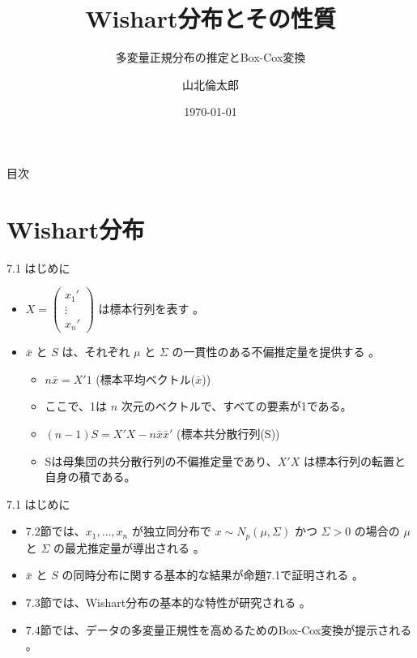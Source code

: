 \documentclass[aspectratio=169]{beamer}
\begin{document}
\begin{CJK}{UTF8}{min}

\title{Wishart分布とその性質}
\subtitle{多変量正規分布の推定とBox-Cox変換}
\author{山北倫太郎}
\date{\today}

\begin{frame}
\titlepage
\end{frame}

\begin{frame}{目次}
\tableofcontents
\end{frame}

\section{Wishart分布}

\begin{frame}{7.1 はじめに}
\begin{itemize}
    \item $X=\begin{pmatrix}x_1' \\ \vdots \\ x_n'\end{pmatrix}$ は標本行列を表す 。
    \item $\bar{x}$ と $S$ は、それぞれ $\mu$ と $\Sigma$ の一貫性のある不偏推定量を提供する 。
    \begin{itemize}
        \item $n\bar{x}=X'1$ (標本平均ベクトル($\bar{x}$))
        \item ここで、1は $n$ 次元のベクトルで、すべての要素が1である。\\
        \item $(n-1)S=X'X-n\bar{x}\bar{x}'$ (標本共分散行列(S))
        \item Sは母集団の共分散行列の不偏推定量であり、$X'X$ は標本行列の転置と自身の積である。
    \end{itemize}

\end{itemize}
\end{frame}
\begin{frame}{7.1 はじめに}
\begin{itemize}
    \item 7.2節では、$x_1, \dots, x_n$ が独立同分布で $x \sim N_p(\mu, \Sigma)$ かつ $\Sigma>0$ の場合の $\mu$ と $\Sigma$ の最尤推定量が導出される 。
    \item $\bar{x}$ と $S$ の同時分布に関する基本的な結果が命題7.1で証明される 。
    \item 7.3節では、Wishart分布の基本的な特性が研究される 。
    \item 7.4節では、データの多変量正規性を高めるためのBox-Cox変換が提示される 。
\end{itemize}
\end{frame}


\end{CJK}
\end{document}
